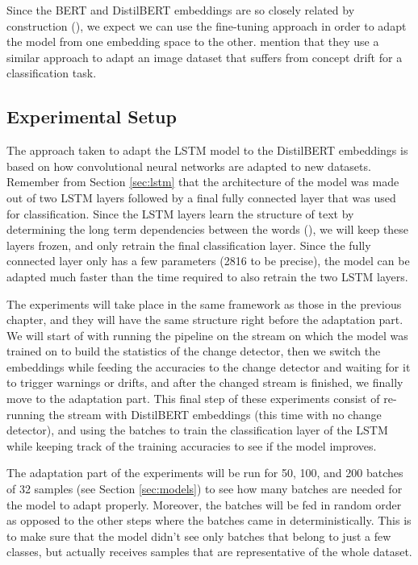 \documentclass[12pt]{extreport}
\begin{document}
Since the BERT and DistilBERT embeddings are so closely related by construction (\cite{distilbert}), we expect we can use the fine-tuning approach in order to adapt the model from one embedding space to the other. \cite{fine-tuning-cd-image} mention that they use a similar approach to adapt an image dataset that suffers from concept drift for a classification task.

\subsection{Experimental Setup}

The approach taken to adapt the LSTM model to the DistilBERT embeddings is based on how convolutional neural networks are adapted to new datasets. Remember from Section \ref{sec:lstm} that the architecture of the model was made out of two LSTM layers followed by a final fully connected layer that was used for classification. Since the LSTM layers learn the structure of text by determining the long term dependencies between the words (\cite{colahlstm}), we will keep these layers frozen, and only retrain the final classification layer. Since the fully connected layer only has a few parameters (2816 to be precise), the model can be adapted much faster than the time required to also retrain the two LSTM layers.

The experiments will take place in the same framework as those in the previous chapter, and they will have the same structure right before the adaptation part. We will start of with running the pipeline on the stream on which the model was trained on to build the statistics of the change detector, then we switch the embeddings while feeding the accuracies to the change detector and waiting for it to trigger warnings or drifts, and after the changed stream is finished, we finally move to the adaptation part. This final step of these experiments consist of re-running the stream with DistilBERT embeddings (this time with no change detector), and using the batches to train the classification layer of the LSTM while keeping track of the training accuracies to see if the model improves.

The adaptation part of the experiments will be run for 50, 100, and 200 batches of 32 samples (see Section \ref{sec:models}) to see how many batches are needed for the model to adapt properly. Moreover, the batches will be fed in random order as opposed to the other steps where the batches came in deterministically. This is to make sure that the model didn't see only batches that belong to just a few classes, but actually receives samples that are representative of the whole dataset.
\end{document}
